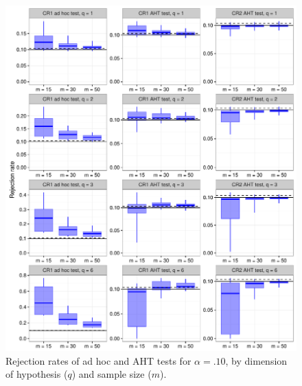 \documentclass{article}\usepackage[]{graphicx}\usepackage[]{color}
\newenvironment{knitrout}{}{} %
\begin{document}
\begin{knitrout}
\color{fgcolor}\begin{figure}[H]

{\centering \includegraphics[width=\linewidth]{CR_fig/overview_10-1} 

}

\caption[Rejection rates of ad hoc and AHT tests for ]{Rejection rates of ad hoc and AHT tests for $\alpha = .10$, by dimension of hypothesis ($q$) and sample size ($m$).}\label{fig:overview_10}
\end{figure}


\end{knitrout}
\end{document}

